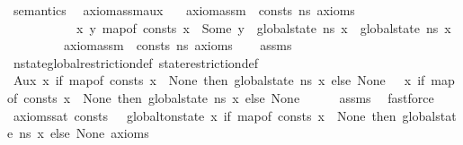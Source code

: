\begin{isabellebody}
\isanewline
\isanewline
{}\isamarkupfalse%
\ semantics\ \isanewline
\isanewline
{}\isamarkupfalse%
\ axiom{\isacharunderscore}{\kern0pt}assm{\isacharunderscore}{\kern0pt}aux{\isacharcolon}{\kern0pt}\isanewline
\ \ \ {\isachardoublequoteopen}axiom{\isacharunderscore}{\kern0pt}assm\ {\isasymGamma}\ consts\ ns{}\ axioms{\isachardoublequoteclose}\ \isanewline
\ \ \ \ \ \ \ \ \ \ {\isachardoublequoteopen}{\isasymAnd}\ x\ y{\isachardot}{\kern0pt}\ map{\isacharunderscore}{\kern0pt}of\ consts\ x\ {\isacharequal}{\kern0pt}\ Some\ y\ {\isasymLongrightarrow}\ {\isacharparenleft}{\kern0pt}global{\isacharunderscore}{\kern0pt}state\ ns{}{\isacharparenright}{\kern0pt}\ x\ {\isacharequal}{\kern0pt}\ {\isacharparenleft}{\kern0pt}global{\isacharunderscore}{\kern0pt}state\ ns{}{\isacharparenright}{\kern0pt}\ x{\isachardoublequoteclose}\isanewline
\ \ \ \ \ \ \ \ \ {\isachardoublequoteopen}axiom{\isacharunderscore}{\kern0pt}assm\ {\isasymGamma}\ consts\ ns{}\ axioms{\isachardoublequoteclose}\isanewline
%
\isadelimproof
\ \ %
\endisadelimproof
%
\isatagproof
{}\isamarkupfalse%
\ assms\isanewline
\ \ \isamarkupfalse%
\ nstate{\isacharunderscore}{\kern0pt}global{\isacharunderscore}{\kern0pt}restriction{\isacharunderscore}{\kern0pt}def\ state{\isacharunderscore}{\kern0pt}restriction{\isacharunderscore}{\kern0pt}def\isanewline
{}\isamarkupfalse%
\ {\isacharminus}{\kern0pt}\isanewline
\ \ \isamarkupfalse%
\ Aux{\isacharcolon}{\kern0pt}{\isachardoublequoteopen}\ {\isacharparenleft}{\kern0pt}{\isasymlambda}x{\isachardot}{\kern0pt}\ if\ map{\isacharunderscore}{\kern0pt}of\ consts\ x\ {\isasymnoteq}\ None\ then\ global{\isacharunderscore}{\kern0pt}state\ ns{}\ x\ else\ None{\isacharparenright}{\kern0pt}\ {\isacharequal}{\kern0pt}\ \ {\isacharparenleft}{\kern0pt}{\isasymlambda}x{\isachardot}{\kern0pt}\ if\ map{\isacharunderscore}{\kern0pt}of\ consts\ x\ {\isasymnoteq}\ None\ then\ global{\isacharunderscore}{\kern0pt}state\ ns{}\ x\ else\ None{\isacharparenright}{\kern0pt}{\isachardoublequoteclose}\isanewline
\ \ \ \ \isamarkupfalse%
\ assms{\isacharparenleft}{\kern0pt}{}{\isacharparenright}{\kern0pt}\ \isamarkupfalse%
\ fastforce\isanewline
\ \ \isamarkupfalse%
\ {\isachardoublequoteopen}axioms{\isacharunderscore}{\kern0pt}sat\ {\isacharparenleft}{\kern0pt}consts{\isacharcomma}{\kern0pt}\ {\isacharbrackleft}{\kern0pt}{\isacharbrackright}{\kern0pt}{\isacharparenright}{\kern0pt}\ {\isasymGamma}\ {\isacharparenleft}{\kern0pt}global{\isacharunderscore}{\kern0pt}to{\isacharunderscore}{\kern0pt}nstate\ {\isacharparenleft}{\kern0pt}{\isasymlambda}x{\isachardot}{\kern0pt}\ if\ map{\isacharunderscore}{\kern0pt}of\ consts\ x\ {\isasymnoteq}\ None\ then\ global{\isacharunderscore}{\kern0pt}state\ ns{}\ x\ else\ None{\isacharparenright}{\kern0pt}{\isacharparenright}{\kern0pt}\ axioms{\isachardoublequoteclose}\isanewline

\end{isabellebody}
